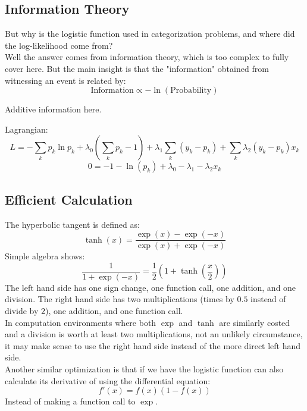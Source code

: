 \subsection{Information Theory}
But why is the logistic function used in categorization problems,
and where did the log-likelihood come from?
\\

Well the answer comes from information theory,
which is too complex to fully cover here.
But the main insight is that the "information" obtained from witnessing an event is related by:
\[\text{Information} \propto -\ln(\text{Probability})\]

Additive information here.

Lagrangian:
\[L = -\sum_kp_k\ln p_k+\lambda_0\left(\sum_k p_k - 1\right) + \lambda_1\sum_k (y_k-p_k) + \sum_k\lambda_2(y_k-p_k)x_k\]
\[ 0 = -1-\ln(p_k) +\lambda_0 -\lambda_1-\lambda_2x_k\]

\subsection{Efficient Calculation}
The hyperbolic tangent is defined as:
\[\tanh(x) = \frac{\exp(x)-\exp(-x)}{\exp(x)+\exp(-x)}\]
Simple algebra shows:
\[\frac{1}{1+\exp(-x)} = \frac{1}{2}\left(1+\tanh\left(\frac{x}{2}\right)\right)\]
The left hand side has one sign change, one function call, one addition, and one division.
The right hand side has two multiplications (times by $0.5$ instead of divide by $2$), one addition, and one function call.
\\

In computation environments where both $\exp$ and $\tanh$ are similarly costed and a division is worth at least two multiplications,
not an unlikely circumstance, 
it may make sense to use the right hand side instead of the more direct left hand side.
\\

Another similar optimization is that if we have the logistic function can also calculate its derivative of using the differential equation:
\[f'(x) = f(x)(1-f(x))\]
Instead of making a function call to $\exp$. 
